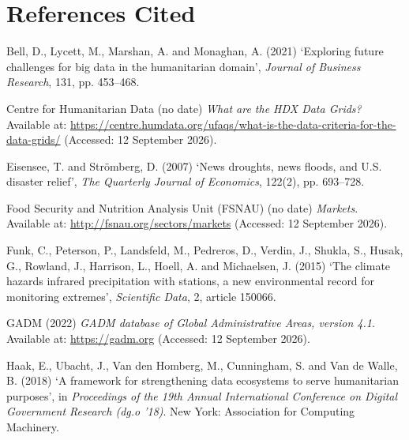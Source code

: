 \documentclass[12pt,a4paper]{article}
\begin{document}
\begingroup
\clearpage
\section*{References Cited}
\begin{list}{}{\setlength{\leftmargin}{1cm}\setlength{\itemindent}{-1cm}\setlength{\itemsep}{8pt}}

\item Bell, D., Lycett, M., Marshan, A. and Monaghan, A. (2021) `Exploring future challenges for big data in the humanitarian domain', \textit{Journal of Business Research}, 131, pp. 453--468.

\item Centre for Humanitarian Data (no date) \textit{What are the HDX Data Grids?} Available at: \url{https://centre.humdata.org/ufaqs/what-is-the-data-criteria-for-the-data-grids/} (Accessed: 12 September 2026).

\item Eisensee, T. and Str\"omberg, D. (2007) `News droughts, news floods, and U.S. disaster relief', \textit{The Quarterly Journal of Economics}, 122(2), pp. 693--728.

\item Food Security and Nutrition Analysis Unit (FSNAU) (no date) \textit{Markets}. Available at: \url{http://fsnau.org/sectors/markets} (Accessed: 12 September 2026).

\item Funk, C., Peterson, P., Landsfeld, M., Pedreros, D., Verdin, J., Shukla, S., Husak, G., Rowland, J., Harrison, L., Hoell, A. and Michaelsen, J. (2015) `The climate hazards infrared precipitation with stations, a new environmental record for monitoring extremes', \textit{Scientific Data}, 2, article 150066.

\item GADM (2022) \textit{GADM database of Global Administrative Areas, version 4.1}. Available at: \url{https://gadm.org} (Accessed: 12 September 2026).

\item Haak, E., Ubacht, J., Van den Homberg, M., Cunningham, S. and Van de Walle, B. (2018) `A framework for strengthening data ecosystems to serve humanitarian purposes', in \textit{Proceedings of the 19th Annual International Conference on Digital Government Research (dg.o '18)}. New York: Association for Computing Machinery.


\end{list}
\end{document}
